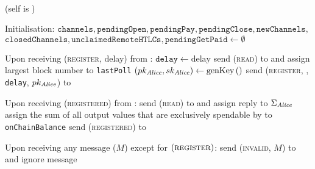 \ \\  (self is \alice)
  \label{alg:lightningprot}
  \begin{algorithmic}[1]
    \State Initialisation:
    \Indent
      \State $\mathtt{channels}, \mathtt{pendingOpen}, \mathtt{pendingPay},
      \mathtt{pendingClose}, \mathtt{newChannels},$ $\mathtt{closedChannels},
      \mathtt{unclaimedRemoteHTLCs}, \mathtt{pendingGetPaid} \gets \emptyset$
    \EndIndent
    \State

    \State Upon receiving (\textsc{register}, delay) from \environment:
    \Indent
      \State $\mathtt{delay} \gets \mathrm{delay}$
      \State send (\textsc{read}) to \ledger{} and assign largest block number
      to \texttt{lastPoll}
      \State $\left(pk_{\mathit{Alice}}, sk_{\mathit{Alice}}\right) \gets
      \mathrm{genKey}\left(\right)$
      \State send (\textsc{register}, \alice, \texttt{delay},
      $pk_{\mathit{Alice}}$) to \adversary {}
    \EndIndent
    \State

    \State Upon receiving (\textsc{registered}) from \adversary:
    \Indent
      \State send (\textsc{read}) to \ledger{} and assign reply to
      $\Sigma_{\mathit{Alice}}$
      \State assign the sum of all output values that are exclusively spendable
      by \alice{} to \texttt{onChainBalance}
      \State send (\textsc{registered}) to \environment
    \EndIndent
    \State

    \State Upon receiving any message ($M$) except for
    $\left(\textsc{register}\right)$:
    \Indent
        \State send (\textsc{invalid}, $M$) to \adversary{} and ignore message
      \EndIf
    \EndIndent
    \State


\end{algorithmic}
